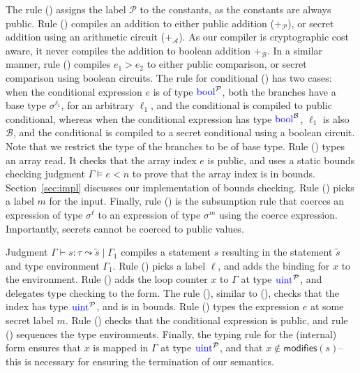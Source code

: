 The rule ({}) assigns the label $\mathcal{P}$ to the
constants, as the constants are always public. Rule ({})
compiles an addition to either public addition ($+_{\mathcal{P}}$), or
secret addition using an arithmetic circuit ($+_{\mathcal{A}}$). As
our compiler is cryptographic cost aware, it never compiles the
addition to boolean addition $+_{\mathcal{B}}$. In a similar manner,
rule ({}) compiles $e_{1} > e_{2}$ to either public comparison,
or secret comparison using boolean circuits. The rule for conditional
({}) has two cases: when the conditional expression $e$ is of
type $\kw{bool}^{\mathcal{P}}$, both the branches have a base type
$\sigma^{\ell_{1}}$, for an arbitrary $\ell_{1}$, and the conditional is
compiled to public conditional, whereas when the conditional
expression has type $\kw{bool}^{\mathcal{B}}$, $\ell_{1}$ is also
$\mathcal{B}$, and the conditional is compiled to a secret conditional
using a boolean circuit. Note that we restrict the type of the branches
to be of base type. Rule ({}) types an array read. It checks
that the array index $e$ is public, and uses a static bounds checking
judgment $\Gamma \models e < n$ to prove that the array index is in
bounds. Section~\ref{sec:impl} discusses our implementation of bounds
checking. Rule ({}) picks a label $m$ for the input. Finally,
rule ({}) is the subsumption rule that coerces an expression of
type $\sigma^{\ell}$ to an expression of type $\sigma^{m}$ using the
coerce expression. Importantly, secrets cannot be coerced to public
values.

Judgment $\Gamma \vdash s : \tau \leadsto \widetilde{s} \mid \Gamma_{1}$
compiles a statement $s$ resulting in the statement $\widetilde{s}$
and type environment $\Gamma_{1}$. Rule ({}) picks a label
$\ell$, and adds the binding for $x$ to the environment. Rule
({}) adds the loop counter $x$ to $\Gamma$ at type
$\kw{uint}^{\mathcal{P}}$, and delegates type checking to the
 form. The rule ({}), similar to ({}),
checks that the index has type $\kw{uint}^{\mathcal{P}}$, and is in
bounds. Rule ({})
types the expression $e$ at some secret label $m$. Rule ({})
checks that the conditional expression is public, and rule
({}) sequences the type environments. Finally, the typing
rule for the (internal)  form ensures that $x$ is mapped in
$\Gamma$ at type $\kw{uint}^{\mathcal{P}}$, and that $x \notin
\mathsf{modifies}(s)$--this is necessary for ensuring the termination
of our semantics.

